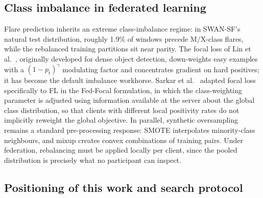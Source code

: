 \subsection{Class imbalance in federated learning}

Flare prediction inherits an extreme class-imbalance regime: in
SWAN-SF's natural test distribution, roughly 1.9\% of windows precede
M/X-class flares, while the rebalanced training partitions sit near
parity. The focal loss of Lin et al.~\cite{lin2017}, originally
developed for dense object detection, down-weights easy examples with a
$(1-p_t)^{\gamma}$ modulating factor and concentrates gradient on hard
positives; it has become the default imbalance workhorse. Sarkar et
al.~\cite{sarkar2020} adapted focal loss specifically to FL in the
Fed-Focal formulation, in which the class-weighting parameter is
adjusted using information available at the server about the global
class distribution, so that clients with different local positivity
rates do not implicitly reweight the global objective. In parallel,
synthetic oversampling remains a standard pre-processing response:
SMOTE \cite{chawla2002} interpolates minority-class neighbours, and
mixup \cite{zhang2018} creates convex combinations of training pairs.
Under federation, rebalancing must be applied locally per client, since
the pooled distribution is precisely what no participant can inspect.

\subsection{Positioning of this work and search protocol}
\label{sec:litsearch}

